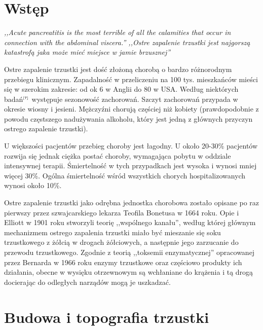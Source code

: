 \documentclass[a4paper, 12pt]{report}
\newcommand\cyt[1]{$^{\tiny{\cite{#1}}}$}
\begin{document}
\chapter*{Wstęp}
{\sl,,Acute pancreatitis is the most terrible of all the calamities
that occur in connection with the abdominal viscera.''
\newline
\newline
,,Ostre zapalenie trzustki jest najgorszą katastrofą jaka może mieć
miejsce w jamie brzusznej''}
{}
\newline
\newline
\newline
\begin{indent}
  Ostre zapalenie trzustki jest dość złożoną chorobą o bardzo
  różnorodnym przebiegu klinicznym. Zapadalność w przeliczeniu na 100
  tys. mieszkańców mieści się w szerokim zakresie: od ok 6 w Anglii do
  80 w USA. Według niektórych badań\cyt{7} występuje sezonowość
  zachorowań.  Szczyt zachorowań przypada w okresie wiosny i jesieni.
  Mężczyźni chorują częściej niż kobiety (prawdopodobnie z powodu
  częstszego nadużywania alkoholu, który jest jedną z głównych
  przyczyn ostrego zapalenie trzustki).

  U większości pacjentów przebieg choroby jest łagodny. U około
  20-30\% pacjentów rozwija się jednak ciężka postać choroby,
  wymagająca pobytu w oddziale intensywnej terapii. Śmiertelność w
  tych przypadkach jest wysoka i wynosi mniej więcej 30\%. Ogólna
  śmiertelność wśród wszystkich chorych hospitalizowanych wynosi około
  10\%.

  Ostre zapalenie trzustki jako odrębna jednostka chorobowa zostało
  opisane po raz pierwszy przez szwajcarskiego lekarza Teofila
  Bonetusa w 1664 roku. Opie i Elliott w 1901 roku stworzyli teorię
  ,,wspólnego kanału'', według której głównym mechanizmem ostrego
  zapalenia trzustki miało być mieszanie się soku trzustkowego z
  żółcią w drogach żółciowych, a następnie jego zarzucanie do przewodu
  trzustkowego. Zgodnie z teorią ,,toksemii enzymatycznej''
  opracowanej przez Bernarda w 1966 roku enzymy trzustkowe oraz
  częściowo produkty ich działania, obecne w wysięku otrzewnowym są
  wchłaniane do krążenia i tą drogą docierając do odległych narządów
  mogą je uszkadzać.
\end{indent}

\chapter{Budowa i topografia trzustki}
\end{document}
